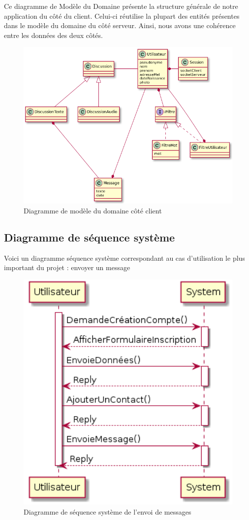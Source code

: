 	Ce diagramme de Modèle du Domaine présente la structure générale de notre application du côté du client.
	Celui-ci réutilise la plupart des entités présentes dans le modèle du domaine du côté serveur.
	Ainsi, nous avons une cohérence entre les données des deux côtés.
	\begin{figure}[H]
		\centerline{\includegraphics[width=16.5cm]{img/modeleDomaineClient.png}}
		\caption{Diagramme de modèle du domaine côté client}
	\end{figure}

	\newpage

	\subsection{Diagramme de séquence système}
	Voici un diagramme séquence système correspondant au cas d'utilisation le plus important du projet : envoyer un message
	\begin{figure}[H]
		\centerline{\includegraphics[width=12.5cm]{img/sequenceSystemeEnvoiMessage.png}}
		\caption{Diagramme de séquence système de l'envoi de messages}
	\end{figure}

